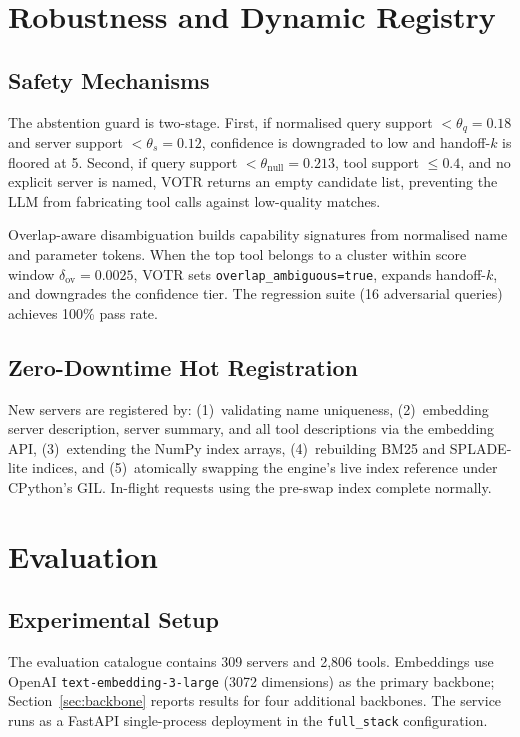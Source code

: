 \documentclass[sigconf,anonymous,review]{acmart}
\newcommand{\votr}{\textsc{VOTR}\xspace}
\begin{document}
\section{Robustness and Dynamic Registry}
\label{sec:robustness}

\subsection{Safety Mechanisms}
The abstention guard is two-stage.
First, if normalised query support $<\theta_q=0.18$ and server support
$<\theta_s=0.12$, confidence is downgraded to low and handoff-$k$ is floored at 5.
Second, if query support $<\theta_{\mathrm{null}}=0.213$, tool support $\le0.4$,
and no explicit server is named, \votr returns an empty candidate list, preventing
the LLM from fabricating tool calls against low-quality matches.

Overlap-aware disambiguation builds capability signatures from normalised name and
parameter tokens.
When the top tool belongs to a cluster within score window $\delta_{\mathrm{ov}}=0.0025$,
\votr sets \texttt{overlap\_ambiguous=true}, expands handoff-$k$, and downgrades
the confidence tier.
The regression suite (16 adversarial queries) achieves 100\% pass rate.

\subsection{Zero-Downtime Hot Registration}
New servers are registered by: (1)~validating name uniqueness, (2)~embedding server
description, server summary, and all tool descriptions via the embedding API,
(3)~extending the NumPy index arrays, (4)~rebuilding BM25 and SPLADE-lite indices,
and (5)~atomically swapping the engine's live index reference under CPython's GIL.
In-flight requests using the pre-swap index complete normally.

\section{Evaluation}

\subsection{Experimental Setup}
The evaluation catalogue contains 309 servers and 2,806 tools.
Embeddings use OpenAI \texttt{text-embedding-3-large} (3072 dimensions) as the
primary backbone; Section~\ref{sec:backbone} reports results for four additional
backbones.
The service runs as a FastAPI single-process deployment in the
\texttt{full\_stack} configuration.
\end{document}
